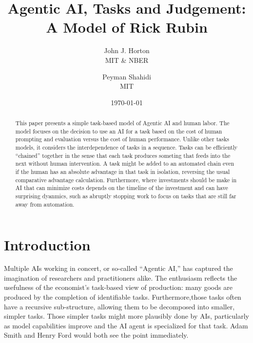 \documentclass{article}
\theoremstyle{plain}
\theoremstyle{plain}
\begin{document}
\title{Agentic AI, Tasks and Judgement:\\ A Model of Rick Rubin}
\author{\normalsize John J. Horton  \\ \normalsize MIT \& NBER  \and \normalsize Peyman Shahidi \\  \normalsize MIT}
\date{\today{}}



\newcommand{\machine}[1]{\langle #1 \rangle}
\newcommand{\human}[1]{( #1 )}
\newcommand{\cost}[1]{C\{ #1 \}}
\newcommand{\costdo}[1]{C_H\{ #1 \}}
\newcommand{\costmanage}[1]{C_M\{ #1 \}}
\newcommand{\tasktime}[1]{t_{#1}}
\newcommand{\taskhc}[1]{c_{#1}}
\newcommand{\labor}[1]{l_{#1}}

\newcommand{\topic}[1]{\paragraph{#1}}

\maketitle

\begin{abstract}
\noindent This paper presents a simple task-based model of Agentic AI and human labor.
The model focuses on the decision to use an AI for a task based on the cost of human prompting and evaluation versus the cost of human performance. 
Unlike other tasks models, it considers the interdependence of tasks in a sequence. 
Tasks can be efficiently ``chained'' together in the sense that each task produces someting that feeds into the next without human intervention.
A task might be added to an automated chain even if the human has an absolute advantage in that task in isolation, reversing the usual comparative advantage calculation.
Furthermore, where investments should be make in AI that can minimize costs depends on the timeline of the investment and can have surprising dyanmics, such as abruptly stopping work to focus on tasks that are still far away from automation.
\end{abstract}

\onehalfspacing
  
\section{Introduction}
Multiple AIs working in concert, or so-called ``Agentic AI,'' has captured the imagination of researchers and practitioners alike.
The enthusiasm reflects the usefulness of the economist's task-based view of production: many goods are produced by the completion of identifiable tasks.
Furthermore,those tasks often have a recursive sub-structure, allowing them to be decomposed into smaller, simpler tasks.
Those simpler tasks might more plausibly done by AIs, particularly as model capabilities improve and the AI agent is specialized for that task. 
Adam Smith and Henry Ford would both see the point immediately. 
\end{document}
